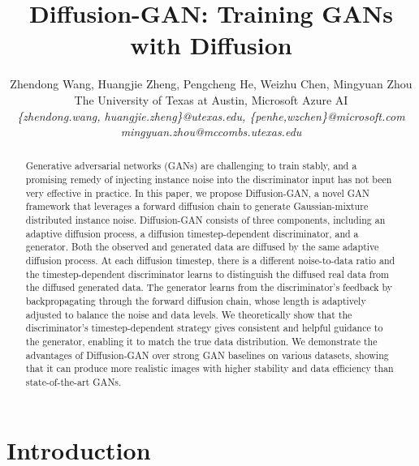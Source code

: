 \documentclass{article} \usepackage{iclr2023_conference,times}
\title{Diffusion-GAN: Training GANs with Diffusion}
\author{
  Zhendong Wang, Huangjie Zheng, Pengcheng He, Weizhu Chen, Mingyuan Zhou \\
  The University of Texas at Austin, Microsoft Azure AI \\ \textit{\{zhendong.wang, huangjie.zheng\}@utexas.edu, \{penhe,wzchen\}@microsoft.com} \\ 
  \textit{mingyuan.zhou@mccombs.utexas.edu }
}
\theoremstyle{plain}
\theoremstyle{definition}
\theoremstyle{remark}
\begin{document}
\maketitle


\begin{abstract}



Generative adversarial networks (GANs) are challenging to train stably, and a promising remedy of injecting instance noise into the discriminator input has not been very effective in practice.  In this paper, we propose Diffusion-GAN, a novel GAN framework that leverages a forward diffusion chain to generate Gaussian-mixture distributed instance noise. Diffusion-GAN consists of three components, including an adaptive diffusion process, a diffusion timestep-dependent discriminator, and a generator. Both the observed and generated data are diffused by the same adaptive diffusion process. At each diffusion timestep, there is a different noise-to-data ratio and the timestep-dependent discriminator learns to distinguish the diffused real data from the diffused generated data. The generator learns from the discriminator's feedback by backpropagating through the forward diffusion chain, whose length is adaptively adjusted to balance the noise and data levels. We theoretically show that the discriminator's timestep-dependent strategy gives consistent and helpful guidance to the generator, enabling it to match the true data distribution. We demonstrate the advantages of Diffusion-GAN over strong GAN baselines on various datasets, showing that it can produce more realistic images with higher stability and data efficiency than state-of-the-art GANs.

\end{abstract}


\section{Introduction} \label{sec:intro}
\end{document}
